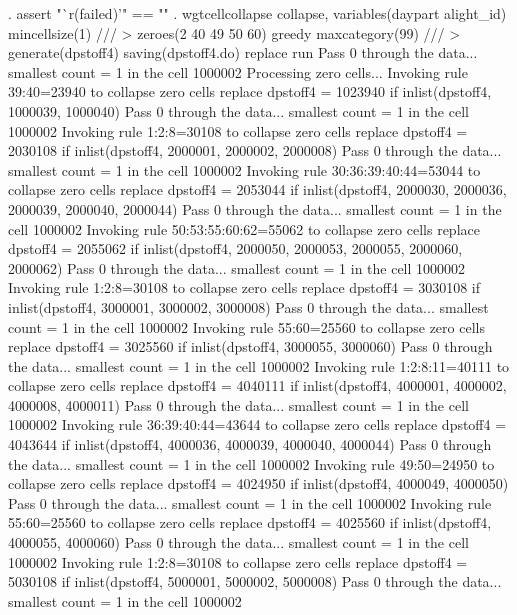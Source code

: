 . assert "`r(failed)'" == ""      
{\smallskip}
. wgtcellcollapse collapse, variables(daypart alight_id) mincellsize(1) ///
>         zeroes(2 40 49 50 60) greedy maxcategory(99) ///
>         generate(dpstoff4) saving(dpstoff4.do) replace run
Pass 0 through the data...
  smallest count = 1 in the cell      1000002
{\smallskip}
Processing zero cells...
{\smallskip}
  Invoking rule 39:40=23940 to collapse zero cells
  replace dpstoff4 = 1023940 if inlist(dpstoff4, 1000039, 1000040)
Pass 0 through the data...
  smallest count = 1 in the cell      1000002
  Invoking rule 1:2:8=30108 to collapse zero cells
  replace dpstoff4 = 2030108 if inlist(dpstoff4, 2000001, 2000002, 2000008)
Pass 0 through the data...
  smallest count = 1 in the cell      1000002
  Invoking rule 30:36:39:40:44=53044 to collapse zero cells
  replace dpstoff4 = 2053044 if inlist(dpstoff4, 2000030, 2000036, 2000039, 2000040, 2000044)
Pass 0 through the data...
  smallest count = 1 in the cell      1000002
  Invoking rule 50:53:55:60:62=55062 to collapse zero cells
  replace dpstoff4 = 2055062 if inlist(dpstoff4, 2000050, 2000053, 2000055, 2000060, 2000062)
Pass 0 through the data...
  smallest count = 1 in the cell      1000002
  Invoking rule 1:2:8=30108 to collapse zero cells
  replace dpstoff4 = 3030108 if inlist(dpstoff4, 3000001, 3000002, 3000008)
Pass 0 through the data...
  smallest count = 1 in the cell      1000002
  Invoking rule 55:60=25560 to collapse zero cells
  replace dpstoff4 = 3025560 if inlist(dpstoff4, 3000055, 3000060)
Pass 0 through the data...
  smallest count = 1 in the cell      1000002
  Invoking rule 1:2:8:11=40111 to collapse zero cells
  replace dpstoff4 = 4040111 if inlist(dpstoff4, 4000001, 4000002, 4000008, 4000011)
Pass 0 through the data...
  smallest count = 1 in the cell      1000002
  Invoking rule 36:39:40:44=43644 to collapse zero cells
  replace dpstoff4 = 4043644 if inlist(dpstoff4, 4000036, 4000039, 4000040, 4000044)
Pass 0 through the data...
  smallest count = 1 in the cell      1000002
  Invoking rule 49:50=24950 to collapse zero cells
  replace dpstoff4 = 4024950 if inlist(dpstoff4, 4000049, 4000050)
Pass 0 through the data...
  smallest count = 1 in the cell      1000002
  Invoking rule 55:60=25560 to collapse zero cells
  replace dpstoff4 = 4025560 if inlist(dpstoff4, 4000055, 4000060)
Pass 0 through the data...
  smallest count = 1 in the cell      1000002
  Invoking rule 1:2:8=30108 to collapse zero cells
  replace dpstoff4 = 5030108 if inlist(dpstoff4, 5000001, 5000002, 5000008)
Pass 0 through the data...
  smallest count = 1 in the cell      1000002
